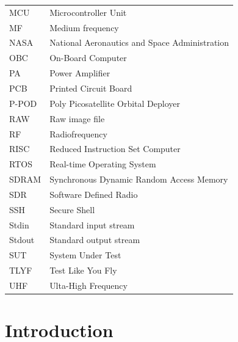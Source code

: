 \documentclass[english,12pt,a4paper,pdftex,elec,utf8]{aaltothesis}
\begin{document}
\begin{tabular}{ll}
MCU 	& Microcontroller Unit \\
MF 		& Medium frequency \\
NASA 	& National Aeronautics and Space Administration \\
OBC 	& On-Board Computer \\
PA	 	& Power Amplifier \\
PCB 	& Printed Circuit Board \\
P-POD	& Poly Picosatellite Orbital Deployer \\
RAW 	& Raw image file \\
RF 		& Radiofrequency \\
RISC 	& Reduced Instruction Set Computer \\
RTOS 	& Real-time Operating System \\
SDRAM 	& Synchronous Dynamic Random Access Memory \\
SDR		& Software Defined Radio \\
SSH		& Secure Shell \\
Stdin 	& Standard input stream \\
Stdout 	& Standard output stream \\
SUT 	& System Under Test \\
TLYF 	& Test Like You Fly \\
UHF 	& Ulta-High Frequency


\end{tabular}


\cleardoublepage
\storeinipagenumber
{}
\setcounter{page}{1}


\section{Introduction}
\end{document}
